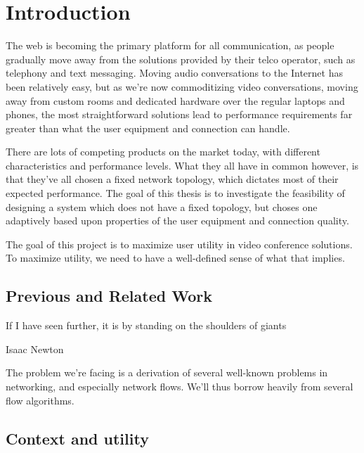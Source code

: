 \chapter{Introduction}\label{chp:introduction}

The web is becoming the primary platform for all communication, as people gradually move away from the solutions provided by their telco operator, such as telephony and text messaging. Moving audio conversations to the Internet has been relatively easy, but as we're now commoditizing video conversations, moving away from custom rooms and dedicated hardware over the regular laptops and phones, the most straightforward solutions lead to performance requirements far greater than what the user equipment and connection can handle.

There are lots of competing products on the market today, with different characteristics and performance levels. What they all have in common however, is that they've all chosen a fixed network topology, which dictates most of their expected performance. The goal of this thesis is to investigate the feasibility of designing a system which does not have a fixed topology, but choses one adaptively based upon properties of the user equipment and connection quality.


The goal of this project is to maximize user utility in video conference solutions. To maximize utility, we need to have a well-defined sense of what that implies.

\section{Previous and Related Work}

\epigraph{If I have seen further, it is by standing on the shoulders of giants}{Isaac Newton}

The problem we're facing is a derivation of several well-known problems in networking, and especially network flows. We'll thus borrow heavily from several flow algorithms.




\section{Context and utility}

